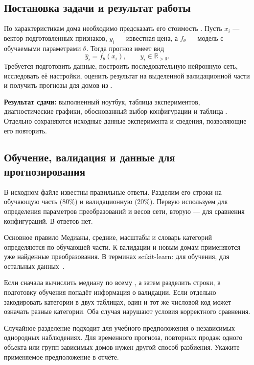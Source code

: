 \subsection{Постановка задачи и результат работы}
По характеристикам дома необходимо предсказать его стоимость
. Пусть \(x_i\) --- вектор подготовленных признаков,
\(y_i\) --- известная цена, а \(f_\theta\) --- модель с обучаемыми
параметрами \(\theta\). Тогда прогноз имеет вид
\begin{equation}
\widehat y_i=f_\theta(x_i),\qquad y_i\in\mathbb R_{>0}.
\end{equation}
Требуется подготовить данные, построить последовательную нейронную сеть,
исследовать её настройки, оценить результат на выделенной валидационной
части и получить прогнозы для домов из .

\textbf{Результат сдачи:} выполненный ноутбук, таблица экспериментов,
диагностические графики, обоснованный выбор конфигурации и таблица
. Отдельно сохраняются исходные данные эксперимента
и сведения, позволяющие его повторить.

\subsection{Обучение, валидация и данные для прогнозирования}
В исходном файле  известны правильные ответы.
Разделим его строки на обучающую часть (80\%) и валидационную (20\%).
Первую используем для определения параметров преобразований и весов сети,
вторую --- для сравнения конфигураций. В  ответов нет.

\begin{keybox}{Основное правило}
Медианы, средние, масштабы и словарь категорий определяются по обучающей
части. К валидации и новым домам применяются уже найденные преобразования.
В терминах scikit-learn:  для обучения,
 для остальных данных~\cite{pitfalls}.
\end{keybox}

Если сначала вычислить медиану по всему , а затем
разделить строки, в подготовку обучения попадёт информация о валидации.
Если отдельно закодировать категории в двух таблицах, один и тот же
числовой код может означать разные категории. Оба случая нарушают
условия корректного сравнения.

Случайное разделение подходит для учебного предположения о независимых
однородных наблюдениях. Для временного прогноза, повторных продаж одного
объекта или групп зависимых домов нужен другой способ разбиения.
Укажите применяемое предположение в отчёте.

